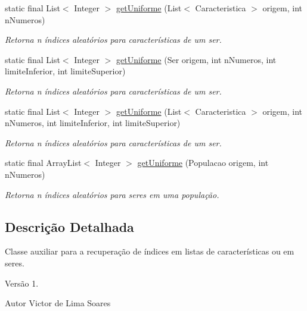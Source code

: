\begin{DoxyCompactItemize}
static final List$<$ Integer $>$ \hyperlink{classic_1_1populacional_1_1utilidades_1_1_indice_aleatorio_acd15ec50342b37c7359b952924a092f2}{get\-Uniforme} (List$<$ Caracteristica $>$ origem, int n\-Numeros)
\begin{DoxyCompactList}\small\item\em Retorna {\itshape n} índices aleatórios para características de um ser. \end{DoxyCompactList}\item 
static final List$<$ Integer $>$ \hyperlink{classic_1_1populacional_1_1utilidades_1_1_indice_aleatorio_a6dc51d0095217dbfaf7b0140407d36c6}{get\-Uniforme} (Ser origem, int n\-Numeros, int limite\-Inferior, int limite\-Superior)
\begin{DoxyCompactList}\small\item\em Retorna {\itshape n} índices aleatórios para características de um ser. \end{DoxyCompactList}\item 
static final List$<$ Integer $>$ \hyperlink{classic_1_1populacional_1_1utilidades_1_1_indice_aleatorio_aef72ba4471671f92147e0904ce1e599f}{get\-Uniforme} (List$<$ Caracteristica $>$ origem, int n\-Numeros, int limite\-Inferior, int limite\-Superior)
\begin{DoxyCompactList}\small\item\em Retorna {\itshape n} índices aleatórios para características de um ser. \end{DoxyCompactList}\item 
static final Array\-List$<$ Integer $>$ \hyperlink{classic_1_1populacional_1_1utilidades_1_1_indice_aleatorio_a453201b8ee1e4468d3ebe80f0b5188cb}{get\-Uniforme} (Populacao origem, int n\-Numeros)
\begin{DoxyCompactList}\small\item\em Retorna n índices aleatórios para seres em uma população. \end{DoxyCompactList}\end{DoxyCompactItemize}


\subsection{Descrição Detalhada}
Classe auxiliar para a recuperação de índices em listas de características ou em seres. 

\begin{DoxyVersion}{Versão}
1. 
\end{DoxyVersion}
\begin{DoxyAuthor}{Autor}
Victor de Lima Soares 
\end{DoxyAuthor}


